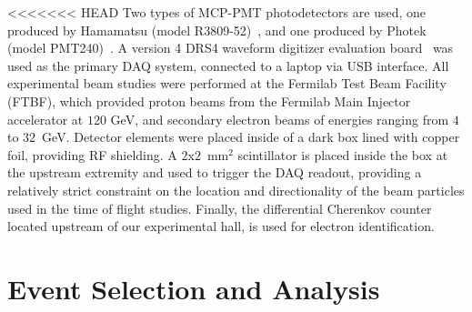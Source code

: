 \documentclass[12pt]{article}
\begin{document}
<<<<<<< HEAD
Two types of MCP-PMT photodetectors 
are used, one produced by Hamamatsu 
(model R3809-52)~\cite{HamamatsuMCP3809}, and one
produced by Photek (model PMT240)~\cite{Photek240}. 
A version 4 DRS4 waveform digitizer evaluation board~\cite{DRS4} was
used as the primary DAQ system, connected to a laptop via
USB interface. All experimental beam studies were performed
at the Fermilab Test Beam Facility (FTBF), which 
provided proton beams from the Fermilab Main Injector accelerator
at $120$ GeV, and secondary electron beams of energies ranging 
from $4$ to $32$~GeV. Detector elements were placed inside of a 
dark box lined with copper foil, providing RF shielding. A
$2$x$2$~$\mathrm{mm}^{2}$ scintillator is placed inside the box at
the upstream extremity and used to trigger the DAQ readout,
providing a relatively strict constraint on the location and directionality
of the beam particles used in the time of flight studies. 
Finally, the differential Cherenkov counter located upstream
of our experimental hall, is used for electron identification. 

\section{Event Selection and Analysis}
\end{document}

